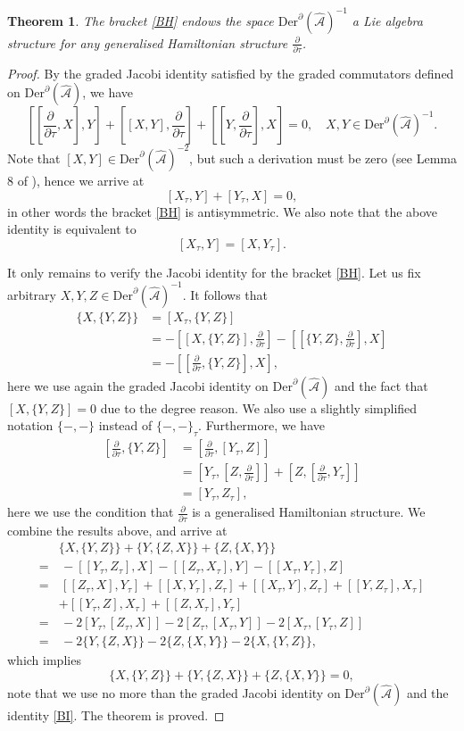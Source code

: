 \documentclass[11pt,a4paper]{amsart}
\numberwithin{equation}{section}
\newtheorem{theorem}{Theorem}[section]
\newcommand{\derx}{\mathrm{Der}^{\qp}(\hm A)}
\newcommand{\diff}[2]{\frac{\partial #1}{\partial #2}}
\newcommand{\qt}{\tau}
\newcommand{\qp}{\partial}
\newcommand{\hm}[1]{\hat{\mathcal #1}}
\newcommand{\fk}[2]{\left[#1, #2\right]}
\numberwithin{equation}{section}
\begin{document}
\begin{theorem}
The bracket \eqref{BH} endows the space $\derx^{-1}$ a Lie algebra structure for any generalised Hamiltonian structure $\diff{}{\qt}$.
\end{theorem}
\begin{proof}
    By the graded Jacobi identity satisfied by the graded commutators defined on $\derx$, we have 
    \[
    \fk{\fk{\diff{}{\qt}}{X}}{Y}+\fk{[X,Y]}{\diff{}{\qt}}+\fk{\fk{Y}{\diff{}{\qt}}}{X} = 0,\quad X,Y\in\derx^{-1}.
    \] 
    Note that $[X,Y]\in\derx^{-2}$, but such a derivation must be zero (see Lemma 8 of \cite{LWZ3}), hence we arrive at 
    \[
    \fk{X_\qt}{Y}+\fk{Y_\qt}{X} = 0,
    \]
    in other words the bracket \eqref{BH} is antisymmetric. We also note that the above identity is equivalent to 
    \begin{equation}
        \label{BI}
        \fk{X_\qt}{Y} = \fk{X}{Y_\qt}.
    \end{equation}

    It only remains to verify the Jacobi identity for the bracket \eqref{BH}. Let us fix arbitrary $X,Y,Z\in\derx^{-1}$. It follows that 
    \begin{align*}
        \{X,\{Y,Z\}\} &=\fk{X_\qt}{\{Y,Z\}}\\
        &=-\fk{\fk{X}{\{Y,Z\}}}{\diff{}{\qt}}-\fk{\fk{\{Y,Z\}}{\diff{}{\qt}}}{X}\\
        &=-\fk{\fk{\diff{}{\qt}}{\{Y,Z\}}}{X},
    \end{align*}
    here we use again the graded Jacobi identity on $\derx$ and the fact that $\fk{X}{\{Y,Z\}} = 0$ due to  the degree reason. We also use a slightly simplified notation $\{-,-\}$ instead of $\{-,-\}_\qt$.
    Furthermore, we have
    \begin{align*}
        \fk{\diff{}{\qt}}{\{Y,Z\}} &= \fk{\diff{}{\qt}}{[Y_\qt,Z]}\\
        &=\fk{Y_\qt}{\fk{Z}{\diff{}{\qt}}}+\fk{Z}{\fk{\diff{}{\qt}}{Y_\qt}}\\
        &=\fk{Y_\qt}{Z_\qt},
    \end{align*} 
    here we use the condition that $\diff{}{\qt}$ is a generalised Hamiltonian structure.
    We combine the results above, and arrive at
    \begin{align*}
        &\{X,\{Y,Z\}\}+\{Y,\{Z,X\}\}+\{Z,\{X,Y\}\}\\
        =&\,-\fk{\fk{Y_\qt}{Z_\qt}}{X}-\fk{\fk{Z_\qt}{X_\qt}}{Y}-\fk{\fk{X_\qt}{Y_\qt}}{Z}\\
        =&\,\fk{\fk{Z_\qt}{X}}{Y_\qt}+\fk{\fk{X}{Y_\qt}}{Z_\qt}+\fk{\fk{X_\qt}{Y}}{Z_\qt}+\fk{\fk{Y}{Z_\qt}}{X_\qt}\\
        &+\fk{\fk{Y_\qt}{Z}}{X_\qt}+\fk{\fk{Z}{X_\qt}}{Y_\qt}\\
        =&\,-2\fk{Y_\qt}{\fk{Z_\qt}{X}}-2\fk{Z_\qt}{\fk{X_\qt}{Y}}-2\fk{X_\qt}{\fk{Y_\qt}{Z}}\\
        =&\,-2\{Y,\{Z,X\}\}-2\{Z,\{X,Y\}\}-2\{X,\{Y,Z\}\},
    \end{align*}
    which implies 
    \[
    \{X,\{Y,Z\}\}+\{Y,\{Z,X\}\}+\{Z,\{X,Y\}\} = 0,
    \]
    note that we use no more than the graded Jacobi identity on $\derx$ and the identity \eqref{BI}. The theorem is proved.


\end{proof}
\end{document}
